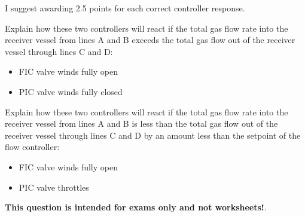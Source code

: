 
I suggest awarding 2.5 points for each correct controller response.

\vskip 10pt

Explain how these two controllers will react if the total gas flow rate into the receiver vessel from lines A and B exceeds the total gas flow out of the receiver vessel through lines C and D: 

\begin{itemize}
\item{} FIC valve winds fully open
\item{} PIC valve winds fully closed
\end{itemize}

\vskip 10pt

Explain how these two controllers will react if the total gas flow rate into the receiver vessel from lines A and B is less than the total gas flow out of the receiver vessel through lines C and D by an amount less than the setpoint of the flow controller: 

\begin{itemize}
\item{} FIC valve winds fully open
\item{} PIC valve throttles
\end{itemize}










{\bf This question is intended for exams only and not worksheets!}.



